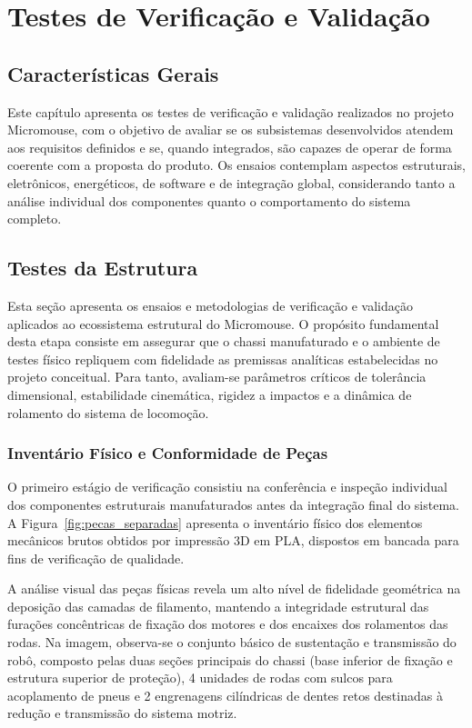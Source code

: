 \chapter{Testes de Verificação e Validação}
\label{testes}

\section{Características Gerais}

Este capítulo apresenta os testes de verificação e validação realizados no projeto Micromouse, com o objetivo de avaliar se os subsistemas desenvolvidos atendem aos requisitos definidos e se, quando integrados, são capazes de operar de forma coerente com a proposta do produto. Os ensaios contemplam aspectos estruturais, eletrônicos, energéticos, de software e de integração global, considerando tanto a análise individual dos componentes quanto o comportamento do sistema completo.

\section{Testes da Estrutura}

Esta seção apresenta os ensaios e metodologias de verificação e validação aplicados ao ecossistema estrutural do Micromouse. O propósito fundamental desta etapa consiste em assegurar que o chassi manufaturado e o ambiente de testes físico repliquem com fidelidade as premissas analíticas estabelecidas no projeto conceitual. Para tanto, avaliam-se parâmetros críticos de tolerância dimensional, estabilidade cinemática, rigidez a impactos e a dinâmica de rolamento do sistema de locomoção.

\subsection{Inventário Físico e Conformidade de Peças}

O primeiro estágio de verificação consistiu na conferência e inspeção individual dos componentes estruturais manufaturados antes da integração final do sistema. A Figura~\ref{fig:pecas_separadas} apresenta o inventário físico dos elementos mecânicos brutos obtidos por impressão 3D em PLA, dispostos em bancada para fins de verificação de qualidade.

A análise visual das peças físicas revela um alto nível de fidelidade geométrica na deposição das camadas de filamento, mantendo a integridade estrutural das furações concêntricas de fixação dos motores e dos encaixes dos rolamentos das rodas. Na imagem, observa-se o conjunto básico de sustentação e transmissão do robô, composto pelas duas seções principais do chassi (base inferior de fixação e estrutura superior de proteção), 4 unidades de rodas com sulcos para acoplamento de pneus e 2 engrenagens cilíndricas de dentes retos destinadas à redução e transmissão do sistema motriz.

